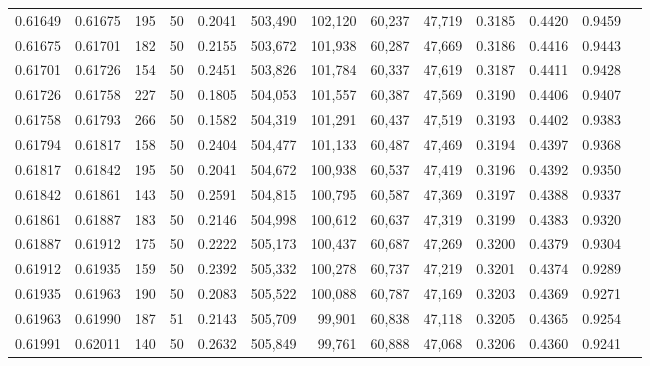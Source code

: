 \begin{tabular}{rrrrrrrrrrrrr}
0.61649 & 0.61675 &   195 &  50 &                                     0.2041 & 503,490 & 102,120 &  60,237 &  47,719 & 0.3185 & 0.4420 & 0.9459 \\
0.61675 & 0.61701 &   182 &  50 &                                     0.2155 & 503,672 & 101,938 &  60,287 &  47,669 & 0.3186 & 0.4416 & 0.9443 \\
0.61701 & 0.61726 &   154 &  50 &                                     0.2451 & 503,826 & 101,784 &  60,337 &  47,619 & 0.3187 & 0.4411 & 0.9428 \\
0.61726 & 0.61758 &   227 &  50 &                                     0.1805 & 504,053 & 101,557 &  60,387 &  47,569 & 0.3190 & 0.4406 & 0.9407 \\
0.61758 & 0.61793 &   266 &  50 &                                     0.1582 & 504,319 & 101,291 &  60,437 &  47,519 & 0.3193 & 0.4402 & 0.9383 \\
0.61794 & 0.61817 &   158 &  50 &                                     0.2404 & 504,477 & 101,133 &  60,487 &  47,469 & 0.3194 & 0.4397 & 0.9368 \\
0.61817 & 0.61842 &   195 &  50 &                                     0.2041 & 504,672 & 100,938 &  60,537 &  47,419 & 0.3196 & 0.4392 & 0.9350 \\
0.61842 & 0.61861 &   143 &  50 &                                     0.2591 & 504,815 & 100,795 &  60,587 &  47,369 & 0.3197 & 0.4388 & 0.9337 \\
0.61861 & 0.61887 &   183 &  50 &                                     0.2146 & 504,998 & 100,612 &  60,637 &  47,319 & 0.3199 & 0.4383 & 0.9320 \\
0.61887 & 0.61912 &   175 &  50 &                                     0.2222 & 505,173 & 100,437 &  60,687 &  47,269 & 0.3200 & 0.4379 & 0.9304 \\
0.61912 & 0.61935 &   159 &  50 &                                     0.2392 & 505,332 & 100,278 &  60,737 &  47,219 & 0.3201 & 0.4374 & 0.9289 \\
0.61935 & 0.61963 &   190 &  50 &                                     0.2083 & 505,522 & 100,088 &  60,787 &  47,169 & 0.3203 & 0.4369 & 0.9271 \\
0.61963 & 0.61990 &   187 &  51 &                                     0.2143 & 505,709 &  99,901 &  60,838 &  47,118 & 0.3205 & 0.4365 & 0.9254 \\
0.61991 & 0.62011 &   140 &  50 &                                     0.2632 & 505,849 &  99,761 &  60,888 &  47,068 & 0.3206 & 0.4360 & 0.9241 \\

\end{tabular}
